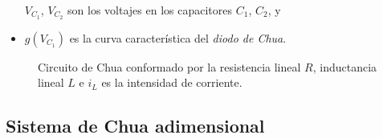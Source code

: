 \begin{frame}
\begin{minipage}{0.55\textwidth}
\begin{itemize}
			      $V_{C_{1}}$, $V_{C_{2}}$ son los voltajes en los capacitores $C_{1}$, $C_{2}$, y

			\item

			      $g\left(V_{C_{1}}\right)$ es la \alert{curva característica} del \emph{diodo de Chua}.
		\end{itemize}
	\end{minipage}
	\begin{minipage}{0.35\textwidth}
		\begin{figure}[ht!]
			\centering
			
			\caption{
				Circuito de Chua conformado por la resistencia lineal $R$,
				inductancia lineal $L$ e $i_{L}$ es la intensidad de corriente.
			}\label{fig:chua_circuit}
		\end{figure}
	\end{minipage}

\end{frame}

\subsection{Sistema de Chua adimensional}

